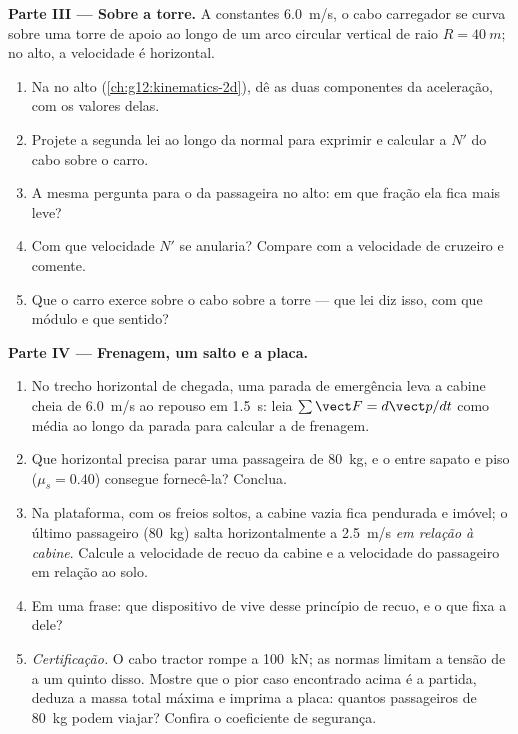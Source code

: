 \begin{problem}
\medskip
\noindent\textbf{Parte III --- Sobre a torre.} A constantes \qty{6.0}{m/s}, o cabo
carregador se curva sobre uma torre de apoio ao longo de um arco circular vertical de
raio $R = \qty{40}{m}$; no alto, a velocidade é horizontal.
\begin{enumerate}[resume]
  \item Na  no alto (\cref{ch:g12:kinematics-2d}), dê as duas
        componentes da aceleração, com os valores delas.
  \item Projete a segunda lei ao longo da normal para exprimir e calcular a  $N'$ do cabo sobre o carro.
  \item A mesma pergunta para o  da passageira no alto: em que fração ela
        fica mais leve?
  \item Com que velocidade $N'$ se anularia? Compare com a velocidade de cruzeiro e
        comente.
  \item Que  o carro exerce sobre o cabo sobre a torre --- que lei diz isso, com
        que módulo e que sentido?
\end{enumerate}

\medskip
\noindent\textbf{Parte IV --- Frenagem, um salto e a placa.}
\begin{enumerate}[resume]
  \item No trecho horizontal de chegada, uma parada de emergência leva a cabine cheia
        de \qty{6.0}{m/s} ao repouso em \qty{1.5}{s}: leia
        $\sum \vect F = d\vect p/dt$ como média ao longo da parada para calcular a
         de frenagem.
  \item Que  horizontal precisa parar uma passageira de \qty{80}{kg}, e o  entre sapato e piso ($\mu_s = 0.40$) consegue fornecê-la? Conclua.
  \item Na plataforma, com os freios soltos, a cabine vazia fica pendurada e imóvel; o
        último passageiro (\qty{80}{kg}) salta horizontalmente a \qty{2.5}{m/s}
        \emph{em relação à cabine}. Calcule a velocidade de recuo da cabine e a
        velocidade do passageiro em relação ao solo.
  \item Em uma frase: que dispositivo de  vive desse princípio de recuo, e o
        que fixa a  dele?
  \item \emph{Certificação.} O cabo tractor rompe a \qty{100}{kN}; as normas limitam a
        tensão de  a um quinto disso. Mostre que o pior caso encontrado acima
        é a partida, deduza a massa total máxima e imprima a placa: quantos
        passageiros de \qty{80}{kg} podem viajar? Confira o coeficiente de segurança.
\end{enumerate}
\end{problem}
